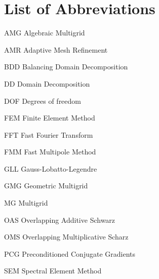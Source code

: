\chapter*{List of Abbreviations}

\begin{abbreviations}
\item[AMG] Algebraic Multigrid
\item[AMR] Adaptive Mesh Refinement
\item[BDD] Balancing Domain Decomposition
\item[DD] Domain Decomposition
\item[DOF] Degrees of freedom
\item[FEM] Finite Element Method
\item[FFT] Fast Fourier Transform
\item[FMM] Fast Multipole Method
\item[GLL] Gauss-Lobatto-Legendre
\item[GMG] Geometric Multigrid
\item[MG] Multigrid
\item[OAS] Overlapping Additive Schwarz
\item[OMS] Overlapping Multiplicative Scharz
\item[PCG] Preconditioned Conjugate Gradients
\item[SEM] Spectral Element Method

\end{abbreviations}